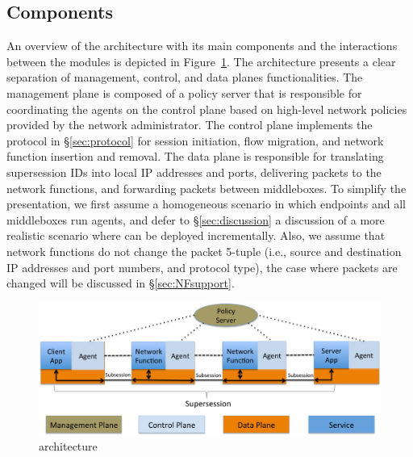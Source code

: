 \subsection{Components}

An overview of  the \system architecture  with its main components and
the    interactions     between   the    modules    is    depicted  in
Figure~\ref{architecture}.   The  architecture     presents    a clear
separation of  management,  control, and  data planes functionalities.
The management  plane   is composed   of  a   policy server that    is
responsible for coordinating the agents on  the control plane based on
high-level network policies provided by the network administrator. The
control  plane implements   the protocol  in  \S\ref{sec:protocol} for
session initiation, flow migration, and network function insertion and
removal.   The data plane is  responsible for translating supersession
IDs  into local IP addresses    and ports, delivering  packets to  the
network functions,  and forwarding   packets between  middleboxes.  To
simplify  the presentation, we first  assume a homogeneous scenario in
which endpoints  and all middleboxes run \system  agents, and defer to
\S\ref{sec:discussion} a discussion of a more realistic scenario where
\system  can be deployed incrementally.  Also,  we assume that network
functions  do  not   change  the  packet  5-tuple  (i.e.,   source and
destination IP addresses  and  port numbers,  and protocol type),  the
case    where     packets  are   changed    will    be   discussed  in
\S\ref{sec:NFsupport}.

\begin{figure}[hb]
\includegraphics[width=\linewidth]{figures/archi.pdf}
\caption{\small\system architecture}\label{architecture}
\end{figure}


